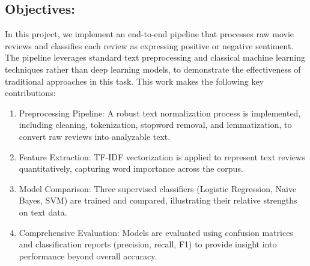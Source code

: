 \documentclass{article}
\begin{document}
\subsection{Objectives:}
In this project, we implement an end-to-end pipeline that processes raw movie reviews and classifies each review as expressing positive or negative sentiment. The pipeline leverages standard text preprocessing and classical machine learning techniques rather than deep learning models, to demonstrate the effectiveness of traditional approaches in this task. This work makes the following key contributions:
\begin{enumerate}
\item Preprocessing Pipeline: A robust text normalization process is implemented, including cleaning, tokenization, stopword removal, and lemmatization, to convert raw reviews into analyzable text.
\item Feature Extraction: TF-IDF vectorization is applied to represent text reviews quantitatively, capturing word importance across the corpus.
\item Model Comparison: Three supervised classifiers (Logistic Regression, Naive Bayes, SVM) are trained and compared, illustrating their relative strengths on text data.
\item Comprehensive Evaluation: Models are evaluated using confusion matrices and classification reports (precision, recall, F1) to provide insight into performance beyond overall accuracy.
\end{enumerate}
\end{document}
